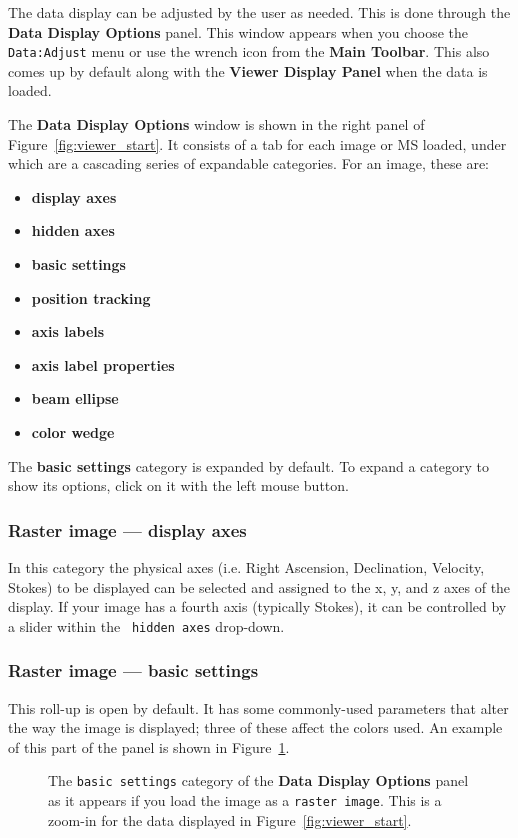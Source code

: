 The data display can be adjusted by the user as needed.  This
is done through the {\bf Data Display Options} panel.  This window
appears when you choose the {\tt Data:Adjust} menu or use the
wrench icon from the {\bf Main Toolbar}.  This also comes up
by default along with the {\bf Viewer Display Panel} when the
data is loaded.

The {\bf Data Display Options} window is shown in the right panel
of Figure~\ref{fig:viewer_start}.  It consists of a tab for each
image or MS loaded, under which are a cascading series of expandable
categories.  For an image, these are:
\begin{itemize}
   \item {\bf display axes}
   \item {\bf hidden axes}
   \item {\bf basic settings}
   \item {\bf position tracking}
   \item {\bf axis labels}
   \item {\bf axis label properties}
   \item {\bf beam ellipse}
   \item {\bf color wedge}
\end{itemize}
The {\bf basic settings} category is expanded by
default.  To expand a category to show its options, click on it with
the left mouse button.


\subsubsection{Raster image --- display axes}
In this category the physical axes (i.e. Right Ascension, Declination,
Velocity, Stokes) to be displayed can be selected and assigned to the
x, y, and z axes of the display. If your image has a fourth axis
(typically Stokes), it can be controlled by a slider within the {\tt
  hidden axes} drop-down.

\subsubsection{Raster image --- basic settings}
\label{section:display.image.raster.adjust.basic}

This roll-up is open by default.  It has some commonly-used parameters
that alter the way the image is displayed; three of these affect the
colors used. An example of this part of the panel is shown in
Figure~\ref{fig:viewer_raster_basic}.

\begin{figure}[h!]
\begin{center}
\caption{\label{fig:viewer_raster_basic} The {\tt basic settings}
category of the {\bf Data Display Options} panel
as it appears if you load the image as a {\tt raster image}.
This is a zoom-in for the data displayed in Figure~\ref{fig:viewer_start}.}
\hrulefill
\end{center}
\end{figure}

